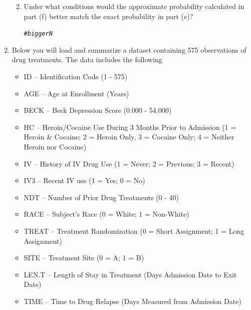 \documentclass{article}\usepackage[]{graphicx}\usepackage[]{color}
\makeatletter
\newcommand{\hlcom}[1]{\textcolor[rgb]{0.678,0.584,0.686}{\textit{#1}}}%
\newenvironment{kframe}{%
 \def\at@end@of@kframe{}%
 \ifinner\ifhmode%
  \def\at@end@of@kframe{\end{minipage}}%
  \begin{minipage}{\columnwidth}%
 \fi\fi%
 \def\FrameCommand##1{\hskip\@totalleftmargin \hskip-\fboxsep
 \colorbox{shadecolor}{##1}\hskip-\fboxsep
     \hskip-\linewidth \hskip-\@totalleftmargin \hskip\columnwidth}%
 \MakeFramed {\advance\hsize-\width
   \@totalleftmargin\z@ \linewidth\hsize
   \@setminipage}}%
 {\par\unskip\endMakeFramed%
 \at@end@of@kframe}
\newenvironment{knitrout}{}{} %
\makeatother
\begin{document}
\begin{enumerate}
\begin{enumerate}
\begin{knitrout}
\begin{kframe}
\begin{verbatim}
\end{verbatim}
\end{kframe}
\end{knitrout}
\item Under what conditions would the approximate probability calculated in 
part (f) better match the exact probability in part (e)?
\begin{knitrout}
\color{fgcolor}\begin{kframe}
\begin{alltt}
\hlcom{#bigger N}
\end{alltt}
\end{kframe}
\end{knitrout}
  \end{enumerate}
\newpage
\item Below you will load and summarize a dataset 
  containing 575 observations of drug treatments. The data includes the following
  \begin{itemize}
    \item ID --	Identification Code	(1 - 575)
    \item AGE	-- Age at Enrollment	(Years)
    \item BECK -- Beck Depression Score	(0.000 - 54.000)
    \item HC --	Heroin/Cocaine Use During	3 Months Prior to Admission (1 = Heroin
    \& Cocaine; 2 = Heroin Only, 3 = Cocaine Only; 4 = Neither Heroin nor Cocaine)
    \item IV -- History of IV Drug Use	(1 = Never; 2 = Previous; 3 = Recent)
    \item IV3	-- Recent IV use	(1 = Yes; 0 = No)
    \item NDT -- Number of Prior Drug Treatments (0 - 40)
    \item RACE -- Subject's Race	(0 = White; 1 = Non-White)
\item TREAT -- Treatment Randomization (0 = Short Assignment;	1 = Long Assignment)
\item SITE -- Treatment Site (0 = A; 1 = B)
\item LEN.T	-- Length of Stay in Treatment (Days Admission Date to Exit Date)	
\item TIME -- Time to Drug Relapse (Days Measured from Admission Date)

\end{itemize}
\end{enumerate}
\end{document}
